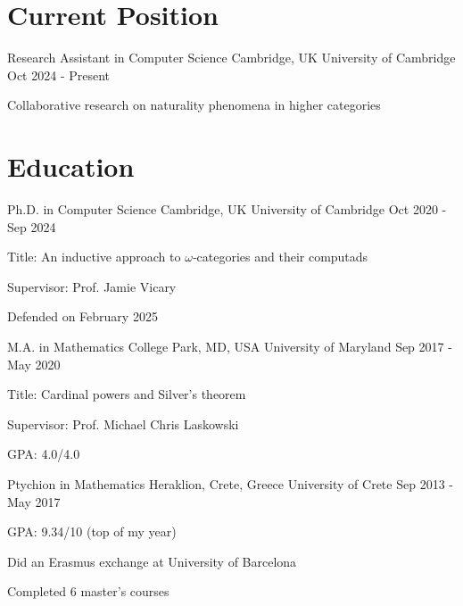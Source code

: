 \documentclass{academic-cv}
\begin{document}
\makecvheader

\section*{Current Position}
    \begin{cvlist}
        \cvheading
            {Research Assistant in Computer Science}
            {Cambridge, UK}
            {University of Cambridge}
            {Oct 2024 - Present}
            {\begin{cvlist}
                \item Collaborative research on naturality phenomena in higher categories
            \end{cvlist}}
    \end{cvlist}

\section*{Education}
    \begin{cvlist}
        \cvheading
            {Ph.D. in Computer Science}
            {Cambridge, UK}
            {University of Cambridge}
            {Oct 2020 - Sep 2024}
            {\begin{cvlist}
                \item Title: An inductive approach to \(\omega\)‑categories and their computads
                \item Supervisor: Prof. Jamie Vicary
                \item Defended on February 2025
            \end{cvlist}}
        \cvheading
            {M.A. in Mathematics}
            {College Park, MD, USA}
            {University of Maryland}
            {Sep 2017 - May 2020}
            {\begin{cvlist}
                \item Title: Cardinal powers and Silver’s theorem
                \item Supervisor: Prof. Michael Chris Laskowski
                \item GPA: 4.0/4.0
            \end{cvlist}}
        \cvheading
            {Ptychion in Mathematics}
            {Heraklion, Crete, Greece}
            {University of Crete}
            {Sep 2013 - May 2017}
            {\begin{cvlist}
                \item GPA: 9.34/10 (top of my year)
                \item Did an Erasmus exchange at University of Barcelona
                \item Completed 6 master's courses
            \end{cvlist}}
    \end{cvlist}
\end{document}
